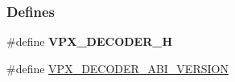 \subsubsection*{\-Defines}
\begin{DoxyCompactItemize}
\item 
\hypertarget{group__decoder_gae9d9e73841dd64cb26053738963e7e69}{
\#define {\bfseries \-V\-P\-X\-\_\-\-D\-E\-C\-O\-D\-E\-R\-\_\-\-H}}
\label{group__decoder_gae9d9e73841dd64cb26053738963e7e69}

\item 
\hypertarget{group__decoder_ga462b459e7ae13937e1eae1776245db12}{
\#define \hyperlink{group__decoder_ga462b459e7ae13937e1eae1776245db12}{\-V\-P\-X\-\_\-\-D\-E\-C\-O\-D\-E\-R\-\_\-\-A\-B\-I\-\_\-\-V\-E\-R\-S\-I\-O\-N}}
\label{group__decoder_ga462b459e7ae13937e1eae1776245db12}


\end{DoxyCompactItemize}
